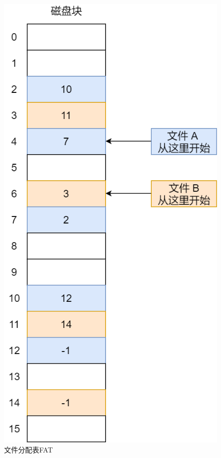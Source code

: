 \begin{figure}[H]
    \centering
    \includegraphics[scale=0.4]{img/C5/5-4/4.png}
    \caption{文件分配表FAT}
\end{figure}

\vspace{0.5cm}

